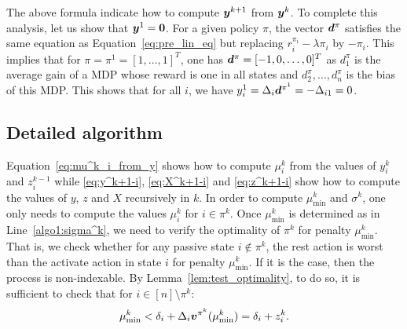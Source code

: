 \documentclass[acmsmall,screen,anonymous]{acmart}
\begin{document}
The above formula indicate how to compute $\boldsymbol{y}^{k+1}$ from $\boldsymbol{y}^k$. To complete this analysis, let us show that $\boldsymbol{y}^1=\mathbf{0}$. For a given policy $\pi$, the vector $\boldsymbol{d}^{\pi}$ satisfies the same equation as Equation~\eqref{eq:pre_lin_eq} but replacing $r^{\pi_i}_i-\lambda\pi_i$ by $-\pi_i$. This implies that for $\pi=\pi^1=[1,\dots,1]^T$, one has $\boldsymbol{d}^\pi=[-1,0,\dots,0]^T$ as $d^\pi_1$ is the average gain of a MDP whose reward is one in all states and $d^\pi_2,\dots, d^\pi_n$ is the bias of this MDP.  This shows that for all $i$, we have $y^{1}_i=\Delta_{i}\boldsymbol{d}^{\pi^{1}}=-\Delta_{i1}=0$. 

\subsection{Detailed algorithm}
\label{ssec:two_third_algo}



Equation~\eqref{eq:mu^k_i_from_y} shows how to compute $\mu^k_i$ from the values of $y^{k}_i$ and $z^{k-1}_i$ while \eqref{eq:y^k+1-i}, \eqref{eq:X^k+1-i} and \eqref{eq:z^k+1-i} show how to compute the values of $y$, $z$ and $X$ recursively in $k$. In order to compute $\mu^k_{\min}$ and $\sigma^k$, one only needs to compute the values $\mu^k_i$ for $i\in\pi^{k}$.  Once $\mu^k_{\min}$ is determined as in Line~\ref{algo1:sigma^k}, we need to verify the optimality of $\pi^k$ for penalty $\mu^k_{\min}$. That is, we check whether for any passive state $i\not\in\pi^k$, the rest action is worst than the activate action in state $i$ for penalty $\mu^k_{\min}$. If it is the case, then the process is non-indexable. By Lemma~\ref{lem:test_optimality}, to do so, it is sufficient to check that for $i\in[n]\setminus\pi^{k}$:
\begin{align}
    \mu^k_{\min} < \delta_i +\Delta_{i}\boldsymbol{v}^{\pi^k}(\mu^k_{\min}) = \delta_i +z^k_i. \label{eq:test}
\end{align}
\end{document}
